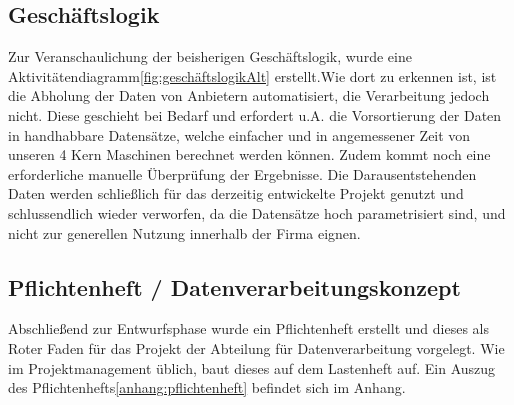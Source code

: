 \subsection{Geschäftslogik}
Zur Veranschaulichung der beisherigen Geschäftslogik, wurde eine Aktivitätendiagramm\ref{fig:geschäftslogikAlt} 
erstellt.Wie dort zu erkennen ist,
ist die Abholung der Daten von Anbietern automatisiert, die Verarbeitung jedoch nicht.
Diese geschieht bei Bedarf und erfordert u.A. die Vorsortierung der Daten in handhabbare
Datensätze, welche einfacher und in angemessener Zeit von unseren 4 Kern Maschinen
berechnet werden können. Zudem kommt noch eine erforderliche manuelle Überprüfung
der Ergebnisse. Die Darausentstehenden Daten werden schließlich für das derzeitig entwickelte Projekt
genutzt und schlussendlich wieder verworfen, da die Datensätze hoch parametrisiert sind,
und nicht zur generellen Nutzung innerhalb der Firma eignen.\par



\subsection{Pflichtenheft / Datenverarbeitungskonzept}
Abschließend zur Entwurfsphase wurde ein Pflichtenheft erstellt und dieses als
Roter Faden für das Projekt der Abteilung für Datenverarbeitung vorgelegt. Wie im
Projektmanagement üblich, baut dieses auf dem Lastenheft auf.
Ein Auszug des Pflichtenhefts\ref{anhang:pflichtenheft} befindet sich im Anhang.
